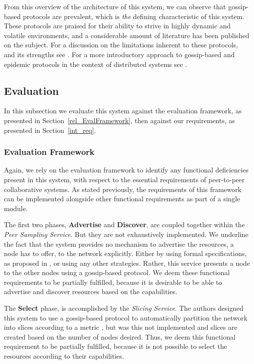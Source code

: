 \documentclass[12pt, titlepage]{uo_temp}
\begin{document}
     From this overview of the architecture of this system, we can observe that gossip-based
     protocols are prevalent, which is \emph{the} defining characteristic of this system. These
     protocols are praised for their ability to strive in highly dynamic and volatile
     environments, and a considerable amount of literature has been published on the
     subject. For a discussion on the limitations inherent to these protocols,
     and its strengths see \cite{birman2007promise}. For a more introductory approach to
     gossip-based and epidemic protocols in the context of distributed systems see
     \cite{jelasitygossip}.


     \subsection{Evaluation}
     In this subsection we evaluate this system against the evaluation
     framework, as presented in Section~\ref{rel_EvalFramework}, then against our
     requirements, as presented in Section~\ref{int_req}.

     \subsubsection{Evaluation Framework}
     Again, we rely on the evaluation framework to identify any functional deficiencies
     present in this system, with respect to the essential requirements of peer-to-peer
     collaborative systems. As stated previously, the requirements of this framework can
     be implemented alongside other functional requirements as part of a single module.

     The first two phases, \textbf{Advertise} and \textbf{Discover}, are coupled together
     within the \emph{Peer Sampling Service}. But they are not exhaustively
     implemented. We underline the fact that the system provides no mechanism to advertise
     the resources, a node has to offer, to the network explicitly. Either by using formal
     specifications, as proposed in \cite{p2p_collab}, or using any other
     strategies. Rather, this service presents a node to the other nodes using a
     gossip-based protocol. We deem these functional requirements to be partially
     fulfilled, because it is desirable to be able to advertise and discover resources
     based on the capabilities.

     The \textbf{Select} phase, is accomplished by the \emph{Slicing Service}. The authors
     designed this system to use a gossip-based protocol to automatically partition the
     network into slices according to a metric \cite{jelasity2006ordered}, but was this
     not implemented and slices are created based on the number of nodes desired. Thus, we
     deem this functional requirement to be partially fulfilled, because it is not
     possible to select the resources according to their capabilities.
\end{document}
